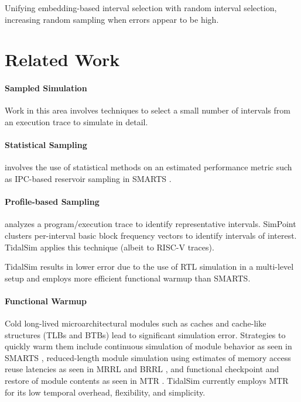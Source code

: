 \documentclass[sigplan,nonacm,10pt]{acmart}
\begin{document}
Unifying embedding-based interval selection with random interval selection, increasing random sampling when errors appear to be high.

\section{Related Work}

\paragraph{Sampled Simulation} Work in this area involves techniques to select a small number of intervals from an execution trace to simulate in detail.

\paragraph{Statistical Sampling} involves the use of statistical methods on an estimated performance metric such as IPC-based reservoir sampling in SMARTS \cite{smarts}.

\paragraph{Profile-based Sampling} analyzes a program/execution trace to identify representative intervals. SimPoint \cite{simpoint3} clusters per-interval basic block frequency vectors to identify intervals of interest. TidalSim applies this technique (albeit to RISC-V traces).

TidalSim results in lower error due to the use of RTL simulation in a multi-level setup and employs more efficient functional warmup than SMARTS.

\paragraph{Functional Warmup} Cold long-lived microarchitectural modules such as caches and cache-like structures (TLBs and BTBs) lead to significant simulation error. Strategies to quickly warm them include continuous simulation of module behavior as seen in SMARTS \cite{smarts}, reduced-length module simulation using estimates of memory access reuse latencies as seen in MRRL \cite{haskins2003memory} and BRRL \cite{eeckhout2005blrl}, and functional checkpoint and restore of module contents as seen in MTR \cite{barr2005accelerating}. TidalSim currently employs MTR for its low temporal overhead, flexibility, and simplicity.
\end{document}
